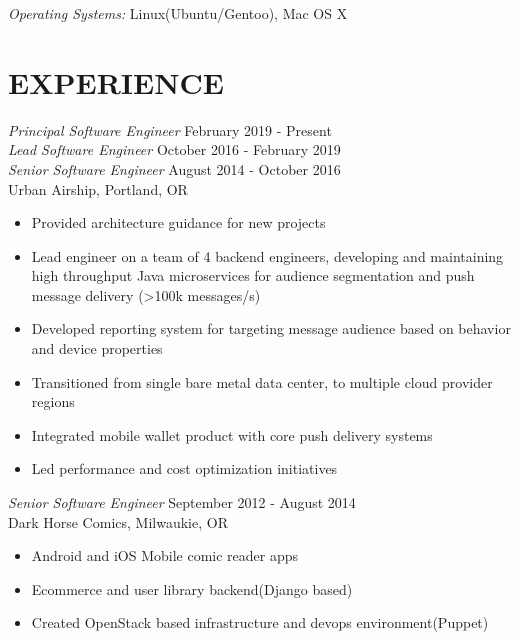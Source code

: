 \documentclass[margin]{res}
\begin{document}
\begin{resume}
		{\sl Operating Systems:} Linux(Ubuntu/Gentoo), Mac OS X

\section{EXPERIENCE}  {\sl Principal Software Engineer} \hfill February 2019 -  Present \\
                {\sl Lead Software Engineer} \hfill October 2016 -  February 2019 \\
		{\sl Senior Software Engineer} \hfill August 2014 - October 2016 \\
                Urban Airship, Portland, OR
                 \begin{itemize}  \itemsep -2pt %
                     \item Provided architecture guidance for new projects
                     \item Lead engineer on a team of 4 backend engineers, developing and maintaining high throughput Java microservices for audience segmentation and push message delivery (\textgreater100k messages/s)
                     \item Developed reporting system for targeting message audience based on behavior and device properties
                     \item Transitioned from single bare metal data center, to multiple cloud provider regions
                     \item Integrated mobile wallet product with core push delivery systems
                     \item Led performance and cost optimization initiatives
                 \end{itemize}

                {\sl Senior Software Engineer} \hfill September 2012 - August 2014 \\
                Dark Horse Comics, Milwaukie, OR
                 \begin{itemize}  \itemsep -2pt %
                 	\item Android and iOS Mobile comic reader apps
               		\item Ecommerce and user library backend(Django based)
              		\item Created OpenStack based infrastructure and devops environment(Puppet)
                \end{itemize}


\end{resume}
\end{document}
